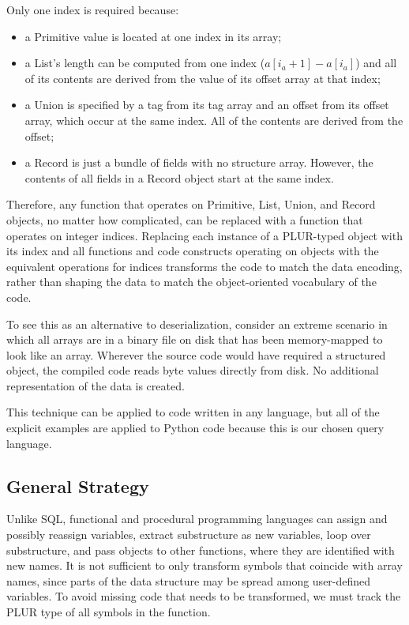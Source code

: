 \documentclass[10pt, conference, compsocconf]{IEEEtran}
\begin{document}
Only one index is required because:
\begin{itemize}
\item a Primitive value is located at one index in its array;
\item a List's length can be computed from one index \mbox{($a[i_a + 1] - a[i_a]$)} and all of its contents are derived from the value of its offset array at that index;
\item a Union is specified by a tag from its tag array and an offset from its offset array, which occur at the same index. All of the contents are derived from the offset;
\item a Record is just a bundle of fields with no structure array. However, the contents of all fields in a Record object start at the same index.
\end{itemize}

Therefore, any function that operates on Primitive, List, Union, and Record objects, no matter how complicated, can be replaced with a function that operates on integer indices. Replacing each instance of a PLUR-typed object with its index and all functions and code constructs operating on objects with the equivalent operations for indices transforms the code to match the data encoding, rather than shaping the data to match the object-oriented vocabulary of the code.

To see this as an alternative to deserialization, consider an extreme scenario in which all arrays are in a binary file on disk that has been memory-mapped to look like an array. Wherever the source code would have required a structured object, the compiled code reads byte values directly from disk. No additional representation of the data is created.

This technique can be applied to code written in any language, but all of the explicit examples are applied to Python code because this is our chosen query language.

\subsection{General Strategy}

Unlike SQL, functional and procedural programming languages can assign and possibly reassign variables, extract substructure as new variables, loop over substructure, and pass objects to other functions, where they are identified with new names. It is not sufficient to only transform symbols that coincide with array names, since parts of the data structure may be spread among user-defined variables. To avoid missing code that needs to be transformed, we must track the PLUR type of all symbols in the function.
\end{document}
